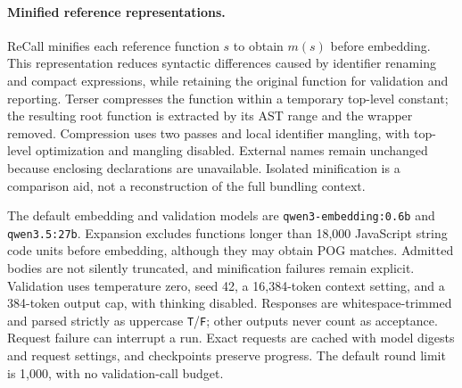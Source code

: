 \paragraph{Minified reference representations.}
ReCall minifies each reference function $s$ to obtain $m(s)$ before embedding. This representation reduces syntactic differences caused by identifier renaming and compact expressions, while retaining the original function for validation and reporting. Terser compresses the function within a temporary top-level constant; the resulting root function is extracted by its AST range and the wrapper removed. Compression uses two passes and local identifier mangling, with top-level optimization and mangling disabled. External names remain unchanged because enclosing declarations are unavailable. Isolated minification is a comparison aid, not a reconstruction of the full bundling context.


The default embedding and validation models are \texttt{qwen3-embedding:0.6b} and \texttt{qwen3.5:27b}. Expansion excludes functions longer than 18,000 JavaScript string code units before embedding, although they may obtain POG matches. Admitted bodies are not silently truncated, and minification failures remain explicit. Validation uses temperature zero, seed 42, a 16,384-token context setting, and a 384-token output cap, with thinking disabled. Responses are whitespace-trimmed and parsed strictly as uppercase \texttt{T}/\texttt{F}; other outputs never count as acceptance. Request failure can interrupt a run. Exact requests are cached with model digests and request settings, and checkpoints preserve progress. The default round limit is 1,000, with no validation-call budget.
